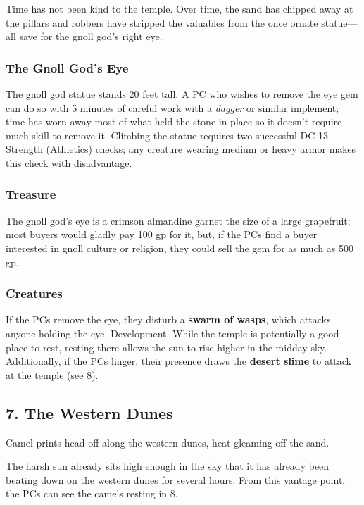 \documentclass[10pt,a4paper,twoside,bg=print,twocolumn,openany,nodeprecatedcode]{dndbook}
\begin{document}
Time has not been kind to the temple. Over time, the sand has chipped away at the pillars and robbers have stripped the valuables from the once ornate statue—all save for the gnoll god's right eye.

\subsubsection{The Gnoll God's Eye}
The gnoll god statue stands 20 feet tall. A PC who wishes to remove the eye gem can do so with 5 minutes of careful work with a \textit{dagger} or similar implement; time has worn away most of what held the stone in place so it doesn't require much skill to remove it. Climbing the statue requires two successful DC 13 Strength (Athletics) checks; any creature wearing medium or heavy armor makes this check with disadvantage.

\subsubsection{Treasure}
The gnoll god's eye is a crimson almandine garnet the size of a large grapefruit; most buyers would gladly pay 100 gp for it, but, if the PCs find a buyer interested in gnoll culture or religion, they could sell the gem for as much as 500 gp.

\subsubsection{Creatures}
If the PCs remove the eye, they disturb a \textbf{swarm of wasps}, which attacks anyone holding the eye. Development. While the temple is potentially a good place to rest, resting there allows the sun to rise higher in the midday sky. Additionally, if the PCs linger, their presence draws the \textbf{desert slime} to attack at the temple (see 8).

\subsection{7. The Western Dunes}
\begin{DndReadAloud}{}
Camel prints head off along the western dunes, heat gleaming off the sand.

\end{DndReadAloud}

The harsh sun already sits high enough in the sky that it has already been beating down on the western dunes for several hours. From this vantage point, the PCs can see the camels resting in 8.
\end{document}
